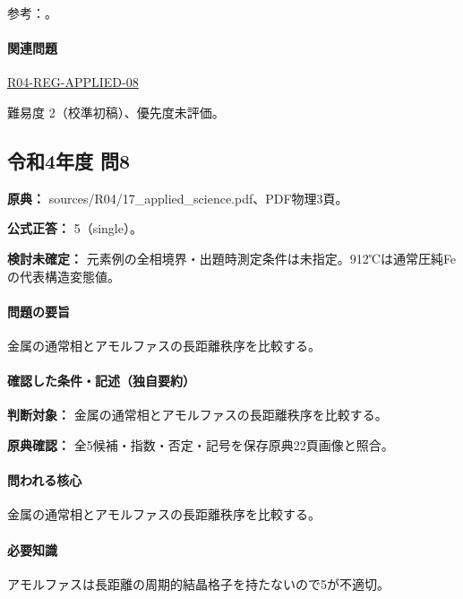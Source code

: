 \par 参考：\cite{openstax_crystals}。

\paragraph{関連問題} \hyperref[q:r04-reg-applied-08]{R04-REG-APPLIED-08}

\par 難易度 2（校準初稿）、優先度未評価。

\subsection{令和4年度 問8}
\label{q:r04-reg-applied-08}

\noindent\textbf{原典：} sources/R04/17\_applied\_science.pdf、PDF物理3頁。

\textbf{公式正答：} 5（single）。

\par\textbf{検討未確定：} 元素例の全相境界・出題時測定条件は未指定。912℃は通常圧純Feの代表構造変態値。

\paragraph{問題の要旨} 金属の通常相とアモルファスの長距離秩序を比較する。

\paragraph{確認した条件・記述（独自要約）}\mbox{}\par

\noindent\textbf{判断対象：} 金属の通常相とアモルファスの長距離秩序を比較する。\par

\noindent\textbf{原典確認：} 全5候補・指数・否定・記号を保存原典22頁画像と照合。\par

\paragraph{問われる核心} 金属の通常相とアモルファスの長距離秩序を比較する。

\paragraph{必要知識} アモルファスは長距離の周期的結晶格子を持たないので5が不適切。

